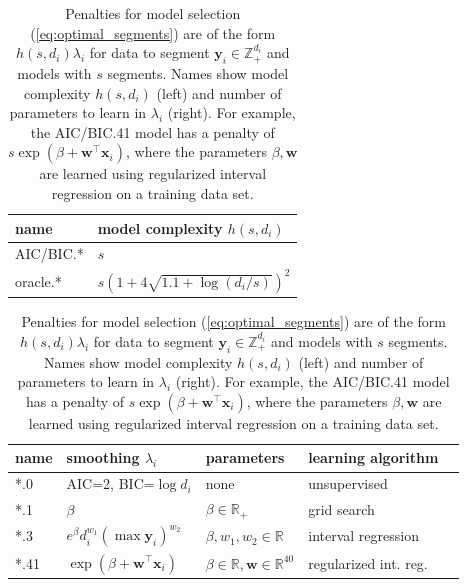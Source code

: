 \documentclass{article}
\newcommand{\ZZ}{\mathbb Z}
\newcommand{\RR}{\mathbb R}
\begin{document}
\begin{table}[b!]

  \begin{minipage}{0.4\textwidth}
  \begin{tabular}{ll}
    \textbf{name} & \textbf{model complexity} $h(s, d_i)$ \\
    \hline
    AIC/BIC.* & $s$\\
    oracle.* & $s\left(1 + 4\sqrt{1.1 + \log(d_i/s)}\right)^2$
  \end{tabular}
  \end{minipage}
  \begin{minipage}{0.5\textwidth}
  \begin{tabular}{lllll}
    \textbf{name} & \textbf{smoothing} $\lambda_i$ & 
    \textbf{parameters} & \textbf{learning algorithm} \\
    \hline
    *.0 & AIC=2, BIC=$\log d_i$ & none & unsupervised \\
    *.1 & 
    $\beta$ & 
    $\beta\in\RR_+$ & grid search \\
    *.3 & 
    $e^\beta d_i^{w_1} (\max \mathbf y_i)^{w_{2}}$ & 
    $\beta, w_1, w_{2}\in\RR$ & interval regression \\
    *.41 & 
    $\exp(\beta + \mathbf w^\intercal \mathbf x_i)$ & 
    $\beta\in\RR, \mathbf w\in\RR^{40}$ & 
    regularized int. reg. \\
  \end{tabular}
  \end{minipage}

  \caption{Penalties for model selection (\ref{eq:optimal_segments}) 
    are of the form
    $h(s, d_i) \lambda_i $ 
    for data to segment $\mathbf y_i\in\ZZ_+^{d_i}$ 
    and models with $s$ segments. 
    Names show model complexity
    $h(s, d_i)$ (left) and number of parameters to learn in $\lambda_i$ (right).
    For example, the AIC/BIC.41 model has a penalty of
    $s \exp(\beta + \mathbf w^\intercal \mathbf x_i)$, 
    where the parameters $\beta,\mathbf w$ 
    are learned using regularized interval regression 
    on a training data set.
  }
  \label{tab:penalties}
\end{table}
\end{document}
